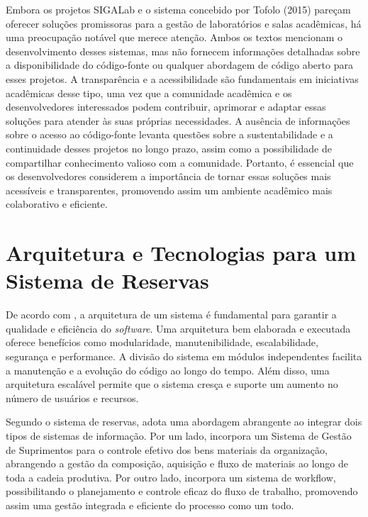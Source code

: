 \documentclass[12pt]{article}
\begin{document}
Embora os projetos SIGALab e o sistema concebido por Tofolo (2015) pareçam oferecer soluções promissoras para a gestão de laboratórios e salas acadêmicas, há uma preocupação notável que merece atenção. Ambos os textos mencionam o desenvolvimento desses sistemas, mas não fornecem informações detalhadas sobre a disponibilidade do código-fonte ou qualquer abordagem de código aberto para esses projetos. A transparência e a acessibilidade são fundamentais em iniciativas acadêmicas desse tipo, uma vez que a comunidade acadêmica e os desenvolvedores interessados podem contribuir, aprimorar e adaptar essas soluções para atender às suas próprias necessidades. A ausência de informações sobre o acesso ao código-fonte levanta questões sobre a sustentabilidade e a continuidade desses projetos no longo prazo, assim como a possibilidade de compartilhar conhecimento valioso com a comunidade. Portanto, é essencial que os desenvolvedores considerem a importância de tornar essas soluções mais acessíveis e transparentes, promovendo assim um ambiente acadêmico mais colaborativo e eficiente.

\section{Arquitetura e Tecnologias para um Sistema de Reservas} \label{sec:arqui_e_tech}


De acordo com \cite{arquitetura}, a arquitetura de um sistema é fundamental para garantir a qualidade e eficiência do \textit{software}. Uma arquitetura bem elaborada e executada oferece benefícios como modularidade, manutenibilidade, escalabilidade, segurança e performance. A divisão do sistema em módulos independentes facilita a manutenção e a evolução do código ao longo do tempo. Além disso, uma arquitetura escalável permite que o sistema cresça e suporte um aumento no número de usuários e recursos.

Segundo \cite{Loh} o sistema de reservas, adota uma abordagem abrangente ao integrar dois tipos de sistemas de informação. Por um lado, incorpora um Sistema de Gestão de Suprimentos para o controle efetivo dos bens materiais da organização, abrangendo a gestão da composição, aquisição e fluxo de materiais ao longo de toda a cadeia produtiva. Por outro lado, incorpora um sistema de workflow, possibilitando o planejamento e controle eficaz do fluxo de trabalho, promovendo assim uma gestão integrada e eficiente do processo como um todo.
\end{document}
